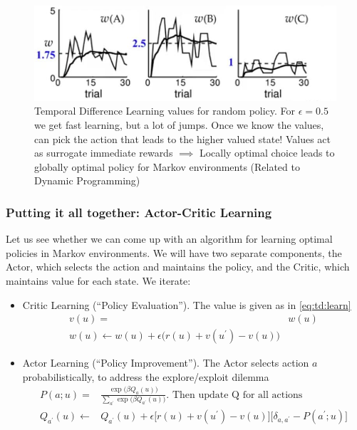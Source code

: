 \documentclass[]{article}
\begin{document}
\begin{figure}[H]
	\begin{center}
		\caption[Temporal Difference Learning values for random policy]{Temporal Difference Learning values for random policy. For $\epsilon=0.5$ we get fast learning, but a lot of jumps. Once we know the values,  can pick the action that leads to the higher valued state! Values act as surrogate immediate 	rewards $\implies$ Locally optimal choice leads to globally optimal 		policy for Markov environments (Related to Dynamic 	Programming)}
		\includegraphics[width=\textwidth]{td-learning-values}
	\end{center}
\end{figure}

\subsubsection{Putting it all together: Actor-Critic Learning}

Let us see whether we can come up with an algorithm for learning optimal policies in Markov environments. We will have two separate components, the Actor, which selects the action and maintains the policy, and the Critic, which maintains value for each state.
We iterate:
\begin{itemize}
	\item Critic Learning (``Policy Evaluation''). The value is given as in \eqref{eq:td:learn}
	\begin{align*}
		v(u) =& w(u)\\
		w(u) \leftarrow w(u) + \epsilon \big(r(u)+v(u^{\prime})-v(u)\big)
	\end{align*}
	\item Actor Learning (``Policy Improvement''). The Actor selects action $a$ probabilistically, to address the explore/exploit dilemma
	\begin{align*}
		P(a;u) =& \frac{\exp \big(\beta Q_a(u)\big)}{\sum_{a^{\prime}}\exp \big(\beta Q_{a^{\prime}}(u)\big)}\text{. Then update Q for all actions}\\
		Q_{a^{\prime}}(u)\leftarrow & Q_{a^{\prime}}(u) + \epsilon\big[r(u)+v(u^{\prime})-v(u)\big]\big[\delta_{a,a^{\prime}}-P(a^{\prime};u)\big]
	\end{align*}
\end{itemize}
\end{document}

